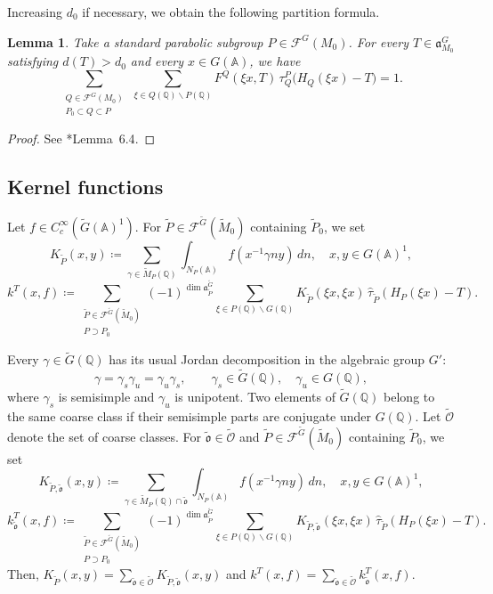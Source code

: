 \documentclass[12pt]{amsart}
\theoremstyle{definition}
\theoremstyle{plain}
\newtheorem{lemma}[definition]{Lemma}
\theoremstyle{remark}
\def\Q{\mathbb{Q}}%
\def\A{\mathbb{A}}%
\newcommand{\fa}{\mathfrak{a}}
\newcommand{\cF}{\mathcal{F}}
\numberwithin{equation}{section}
\newcommand{\tG}{\widetilde{G}}
\newcommand{\tM}{\widetilde{M}}
\newcommand{\tP}{\widetilde{P}}
\newcommand{\tfo}{\widetilde{\mathfrak{o}}}
\newcommand{\tcO}{\widetilde{\mathcal{O}}}
\begin{document}
Increasing $d_0$ if necessary, we obtain the following partition formula. 
\begin{lemma}
\label{lem:partitionformula}
Take a standard parabolic subgroup $P\in\cF^G(M_0)$. 
For every $T\in\fa_{M_0}^G$ satisfying $d(T)>d_0$ and every
$x\in G(\A)$, we have
\begin{equation*}
  \sum_{\substack{Q\in\cF^G(M_0)\\ P_0 \subset Q\subset P}}
  \ \sum_{\xi\in Q(\Q)\backslash P(\Q)}
  F^Q(\xi x,T)\,
  \tau_Q^P\bigl(H_Q(\xi x)-T\bigr)
  =1.
\end{equation*}
\end{lemma}
\begin{proof}
See \cite{Art78}*{Lemma~6.4}.
\end{proof}


  

       
\subsection{Kernel functions}



Let $f\in C_c^\infty(\tG(\A)^1)$.
For $\tP\in\cF^{\tG}(\tM_0)$ containing $\tP_0$, we set
\begin{equation*}
  K_{\tP}(x,y)
    \coloneqq \sum_{\gamma\in\tM_P(\Q)}
       \int_{N_P(\A)} f(x^{-1}\gamma n y)\,dn, \quad x, y\in G(\A)^1,
\end{equation*}
\[
  k^{T}(x,f)
   \coloneqq\sum_{\substack{\tP\in\cF^{\tG}(\tM_0)\\P\supset P_0}}
      (-1)^{\dim\fa_{\tP}^{\tG}}
      \sum_{\xi\in P(\Q)\backslash G(\Q)}
       K_{\tP}(\xi x,\xi x)\, \widehat{\tau}_{\tP}(H_P(\xi x)-T).
\]


Every $\gamma\in\tG(\Q)$ has its usual Jordan decomposition
in the algebraic group $G'$:
\[
  \gamma=\gamma_s\gamma_u=\gamma_u\gamma_s,
  \qquad \gamma_s\in\tG(\Q),\quad \gamma_u\in G(\Q),
\]
where $\gamma_s$ is semisimple and $\gamma_u$ is unipotent.
Two elements of $\tG(\Q)$ belong to the same coarse class
if their semisimple parts are conjugate under $G(\Q)$.
Let $\tcO$ denote the set of coarse classes.
For $\tfo\in\tcO$ and $\tP\in\cF^{\tG}(\tM_0)$ containing $\tP_0$, we set
\begin{equation*}
  K_{\tP,\tfo}(x,y)
    \coloneqq \sum_{\gamma\in\tM_P(\Q)\cap\tfo}
       \int_{N_P(\A)} f(x^{-1}\gamma n y)\,dn, \quad x, y\in G(\A)^1,
\end{equation*}
\begin{equation*}
  k_{\tfo}^{T}(x,f)
   \coloneqq\sum_{\substack{\tP\in\cF^{\tG}(\tM_0)\\P\supset P_0}}
      (-1)^{\dim\fa_{\tP}^{\tG}}
      \sum_{\xi\in P(\Q)\backslash G(\Q)}
       K_{\tP,\tfo}(\xi x,\xi x)\, \widehat{\tau}_{\tP}(H_P(\xi x)-T).
\end{equation*}
Then, $K_{\tP}(x,y)=\sum_{\tfo\in\tcO}K_{\tP,\tfo}(x,y)$ and $k^{T}(x,f)=\sum_{\tfo\in\tcO}k^{T}_{\tfo}(x,f)$.
\end{document}
